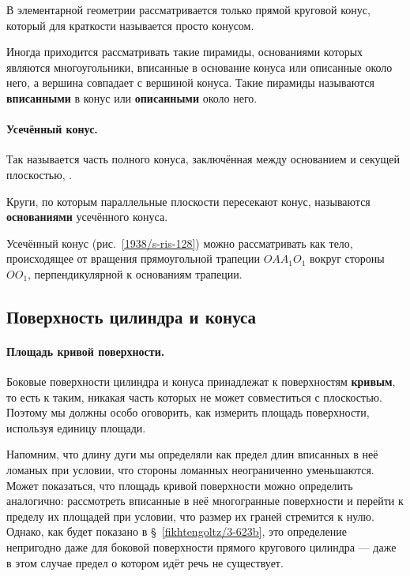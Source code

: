В элементарной геометрии рассматривается только прямой круговой конус, который для краткости называется просто конусом.

Иногда приходится рассматривать такие пирамиды, основаниями которых являются многоугольники, вписанные в основание конуса или описанные около него, а вершина совпадает с вершиной конуса.
Такие пирамиды называются \textbf{вписанными} в конус или \textbf{описанными} около него.

\paragraph{Усечённый конус.}\label{1938/s110}
Так называется часть полного конуса, заключённая между основанием и секущей плоскостью, .

Круги, по которым параллельные плоскости пересекают конус, называются \textbf{основаниями} усечённого конуса.

Усечённый конус (рис.~\ref{1938/s-ris-128}) можно рассматривать как тело, происходящее от вращения прямоугольной трапеции $OAA_1O_1$ вокруг стороны $OO_1$, перпендикулярной к основаниям трапеции.

\subsection*{Поверхность цилиндра и конуса}

\paragraph{Площадь кривой поверхности.}\label{1938/s111}
Боковые поверхности цилиндра и конуса принадлежат к поверхностям {}\textbf{кривым}, то есть к таким, никакая часть которых не может совместиться с плоскостью.
Поэтому мы должны особо оговорить, как измерить площадь  поверхности, используя  единицу площади.

Напомним, что длину дуги мы определяли как предел длин вписанных в неё ломаных при условии, что стороны ломанных неограниченно уменьшаются.
Может показаться, что площадь кривой поверхности можно определить аналогично: рассмотреть вписанные в неё многогранные поверхности и перейти к пределу их площадей при условии, что размер их граней стремится к нулю.
Однако, как будет показано в §~\ref{fikhtengoltz/3-623b}, это определение непригодно даже для боковой поверхности прямого кругового цилиндра — даже в этом случае предел о котором идёт речь не существует.

